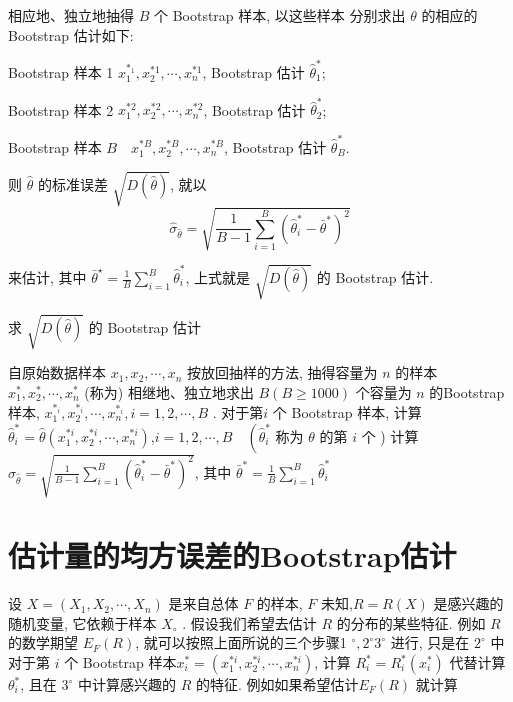 相应地、独立地抽得 $ B $ 个 Bootstrap 样本, 以这些样本 分别求出 $ \theta $ 的相应的 Bootstrap 估计如下:

Bootstrap 样本 1 $ x_{1}^{*_{1}}, x_{2}^{* 1}, \cdots, x_{n}^{* 1} $, Bootstrap 估计 $ \hat{\theta}_{1}^{*} $;

Bootstrap 样本 2 $ x_{1}^{* 2}, x_{2}^{* 2}, \cdots, x_{n}^{* 2} $, Bootstrap 估计 $ \hat{\theta}_{2}^{*} $;

Bootstrap 样本 $ {B} \quad {x}_{1}^{* B}, {x}_{2}^{* B}, \cdots, {x}_{n}^{* B} $, Bootstrap 估计 $ \hat{\theta}_{B}^{*} $.

则 $ \hat{\theta} $ 的标准误差 $ \sqrt{D(\hat{\theta})} $, 就以
$$
\hat{\sigma}_{\hat{\theta}}=\sqrt{\frac{1}{B-1} \sum_{i=1}^{B}\left(\hat{\theta}_{i}^{*}-\bar{\theta}^{*}\right)^{2}}
$$

来估计, 其中 $ \bar{\theta}^{\star}=\frac{1}{B} \sum_{i=1}^{B} \hat{\theta}_{i}^{*} $, 上式就是 $ \sqrt{D(\hat{\theta})} $ 的 Bootstrap 估计. 

\begin{algorithm}
    \caption{求 $ \sqrt{D(\hat{\theta})} $ 的 Bootstrap 估计}
    自原始数据样本 $ x_{1}, x_{2}, \cdots, x_{n} $ 按放回抽样的方法, 抽得容量为 $ n $ 的样本 $ x_{1}^{*}, x_{2}^{*}, \cdots, x_{n}^{*} $ (称为)\;
    相继地、独立地求出 $ B(B \geq 1000) $ 个容量为 $ n $ 的Bootstrap 样本, $ x_{1}^{*_{i}}, x_{2}^{*_{i}}, \cdots, x_{n}^{*_{i}}, {i}={1}, {2}, \cdots, {B} $ .  对于第$ {i} $ 个 Bootstrap 样本, 计算 $ \hat{\theta}_{i}^{*}=\hat{\theta}\left(x_{1}^{* i}, x_{2}^{* i}, \cdots, x_{n}^{* i}\right) $,$ {i}={1}, {2}, \cdots, B \quad\left(\hat{\theta}_{i}^{*}\right. $ 称为 $ \theta $ 的第 $ {i} $ 个 )\;
    计算$ \hat{\sigma}_{\hat{\theta}}=\sqrt{\frac{1}{B-1} \sum_{i=1}^{B}\left(\hat{\theta}_{i}^{*}-\bar{\theta}^{*}\right)^{2}} $, 其中 $ \bar{\theta}^{*}=\frac{1}{B} \sum_{i=1}^{B} \hat{\theta}_{i}^{*} $
\end{algorithm}

\section{估计量的均方误差的Bootstrap估计}

设 $ X=\left(X_{1}, X_{2}, \cdots, X_{n}\right) $ 是来自总体 $ F $ 的样本, $ F $ 未知,$ {R}={R}({X}) $ 是感兴趣的随机变量, 它依赖于样本 $ {X}_{\circ} $ . 假设我们希望去估计 $ R $ 的分布的某些特征. 例如 $ R $ 的数学期望 $ E_{F}({R}) $, 就可以按照上面所说的三个步骤1 $ ^{\circ}, 2^{\circ} $$ 3^{\circ} $ 进行, 只是在 $ 2^{\circ} $ 中对于第 $ {i} $ 个 Bootstrap 样本$ {x}_{i}^{*}=\left(x_{1}^{* i}, x_{2}^{* i}, \cdots, x_{n}^{* i}\right) $, 计算 $ R_{i}^{*}=R_{i}^{*}\left(x_{i}^{*}\right) $ 代替计算 $ \theta_{i}^{*} $, 且在 $ 3^{\circ} $ 中计算感兴趣的 $ R $ 的特征. 例如如果希望估计$ {E}_{F}({R}) $ 就计算

